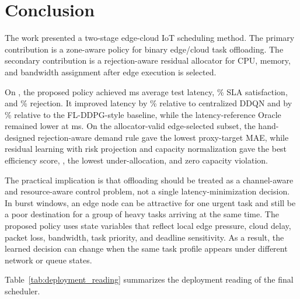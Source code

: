 \section{Conclusion}
\label{sec:conclusion}

The work presented a two-stage edge-cloud IoT scheduling method. The primary contribution is a zone-aware \fedddqn{} policy for binary edge/cloud task offloading. The secondary contribution is a rejection-aware residual allocator for CPU, memory, and bandwidth assignment after edge execution is selected.

On \dataset{}, the proposed policy achieved \FedLatency{} ms average test latency, \FedSLA\% SLA satisfaction, and \FedRejection\% rejection. It improved latency by \FedVsDDQN\% relative to centralized DDQN and by \FedVsFLDDPG\% relative to the FL-DDPG-style baseline, while the latency-reference Oracle remained lower at \OracleLatency{} ms. On the allocator-valid edge-selected subset, the hand-designed rejection-aware demand rule gave the lowest proxy-target MAE, while residual learning with risk projection and capacity normalization gave the best efficiency score, \AllocatorBestEfficiency{}, the lowest under-allocation, and zero capacity violation.

The practical implication is that offloading should be treated as a channel-aware and resource-aware control problem, not a single latency-minimization decision. In burst windows, an edge node can be attractive for one urgent task and still be a poor destination for a group of heavy tasks arriving at the same time. The proposed policy uses state variables that reflect local edge pressure, cloud delay, packet loss, bandwidth, task priority, and deadline sensitivity. As a result, the learned decision can change when the same task profile appears under different network or queue states.

Table~\ref{tab:deployment_reading} summarizes the deployment reading of the final scheduler.

